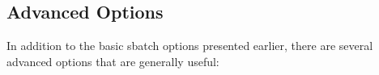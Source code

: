 
\subsection{Advanced  Options}
\label{sect:submit-options}
\label{sect:qsub-options}

In addition to the basic sbatch options presented earlier, 
there are several advanced options that are generally useful:

